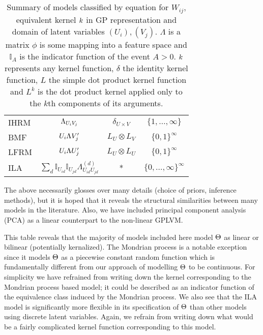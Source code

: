 \begin{table}[h]
\begin{tabular}{l|ccc}
    IHRM  &$\Lambda_{U_iV_j}$ & $\delta_{U\times V}$ & $\{1,\ldots,\infty\}$ \\%
    BMF  & $U_i\Lambda V_j'$ & $L_U \otimes L_V$ & $\{0,1\}^\infty$ \\%
    LFRM  & $U_i\Lambda U_j'$ & $L_U \otimes L_U$ & $\{0,1\}^\infty$ \\%
    ILA & $\sum_d \mathbb{I}_{U_{id}}\mathbb{I}_{U_{jd}}\Lambda^{(d)}_{U_{id}U_{jd}}$ & * & $\{0,\ldots,\infty\}^\infty$ \\%
\end{tabular}
\caption{
Summary of models classified by equation for $W_{ij}$, equivalent kernel $k$ in GP representation and domain of latent variables $(U_i), (V_j)$.
$\Lambda$ is a matrix $\phi$ is some mapping into a feature space and $\mathbb{I}_A$ is the indicator function of the event $A>0$.
$k$ represents any kernel function, $\delta$ the identity kernel function, $L$ the simple dot product kernel function and $L^k$ is the dot product kernel applied only to the $k$th components of its arguments.
}
\label{table:ModelComparison}
\end{table}

The above necessarily glosses over many details (\eg choice of priors, inference methods), but it is hoped that it reveals the structural similarities between many models in the literature.
Also, we have included principal component analysis (PCA) as a linear counterpart to the non-linear GPLVM.

This table reveals that the majority of models included here model $\Theta$ as linear or bilinear (potentially kernalized).
The Mondrian process \cite{Roy2009} is a notable exception since it models $\Theta$ as a piecewise constant random function which is fundamentally different from our approach of modelling $\Theta$ to be continuous.
For simplicity we have refrained from writing down the kernel corresponding to the Mondrian process based model; it could be described as an indicator function of the equivalence class induced by the Mondrian process.
We also see that the ILA model is significantly more flexible in its specification of $\Theta$ than other models using discrete latent variables.
Again, we refrain from writing down what would be a fairly complicated kernel function corresponding to this model.


